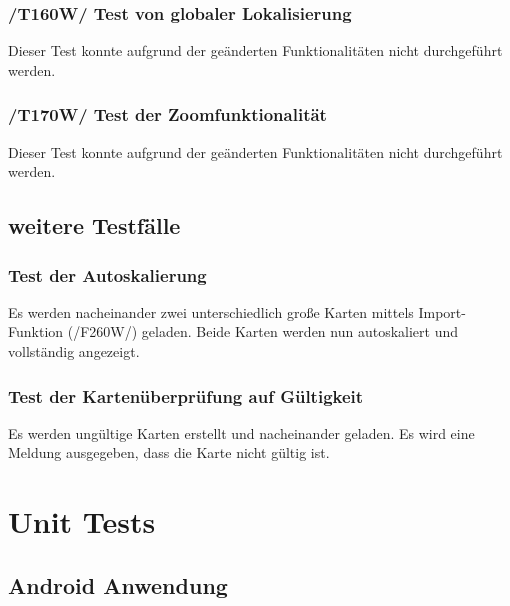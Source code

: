 \documentclass[10pt,a4paper]{article}
\begin{document}
			\subsubsection{/T160W/ Test von globaler Lokalisierung}
			Dieser Test konnte aufgrund der ge\"anderten Funktionalit\"aten nicht durchgef\"uhrt werden.
			
			\subsubsection{/T170W/ Test der Zoomfunktionalit\"at}
			Dieser Test konnte aufgrund der ge\"anderten Funktionalit\"aten nicht durchgef\"uhrt werden.
		
		\subsection{weitere Testfälle}
					\subsubsection{Test der Autoskalierung}
					Es werden nacheinander zwei unterschiedlich gro\ss e Karten mittels Import-Funktion (/F260W/) geladen. Beide Karten
					werden nun autoskaliert und vollst\"andig angezeigt.
					\subsubsection{Test der Karten\"uberpr\"ufung auf G\"ultigkeit}
					Es werden ung\"ultige Karten erstellt und nacheinander geladen. Es wird eine Meldung ausgegeben, dass die Karte nicht g\"ultig ist.
	
	\section{Unit Tests}
		\subsection{Android Anwendung}
		
\end{document}
